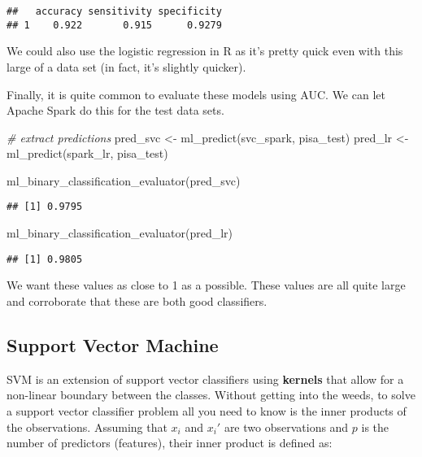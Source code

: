 \documentclass[
]{book}
\newenvironment{Shaded}{\begin{snugshade}}{\end{snugshade}}
\newcommand{\CommentTok}[1]{\textcolor[rgb]{0.56,0.35,0.01}{\textit{#1}}}
\newcommand{\FunctionTok}[1]{\textcolor[rgb]{0.00,0.00,0.00}{#1}}
\newcommand{\NormalTok}[1]{#1}
\newcommand{\OtherTok}[1]{\textcolor[rgb]{0.56,0.35,0.01}{#1}}
\begin{document}
\begin{verbatim}
##   accuracy sensitivity specificity
## 1    0.922       0.915      0.9279
\end{verbatim}

We could also use the logistic regression in R as it's pretty quick even with this large of a data set (in fact, it's slightly quicker).

Finally, it is quite common to evaluate these models using AUC. We can let Apache Spark do this for the test data sets.

\begin{Shaded}
\begin{Highlighting}[]
\CommentTok{\# extract predictions}
\NormalTok{pred\_svc }\OtherTok{\textless{}{-}} \FunctionTok{ml\_predict}\NormalTok{(svc\_spark, pisa\_test)}
\NormalTok{pred\_lr }\OtherTok{\textless{}{-}} \FunctionTok{ml\_predict}\NormalTok{(spark\_lr, pisa\_test)}

\FunctionTok{ml\_binary\_classification\_evaluator}\NormalTok{(pred\_svc)}
\end{Highlighting}
\end{Shaded}

\begin{verbatim}
## [1] 0.9795
\end{verbatim}

\begin{Shaded}
\begin{Highlighting}[]
\FunctionTok{ml\_binary\_classification\_evaluator}\NormalTok{(pred\_lr)}
\end{Highlighting}
\end{Shaded}

\begin{verbatim}
## [1] 0.9805
\end{verbatim}

We want these values as close to 1 as a possible. These values are all quite large and corroborate that these are both good classifiers.

\hypertarget{support-vector-machine}{%
\subsection{Support Vector Machine}\label{support-vector-machine}}

SVM is an extension of support vector classifiers using \textbf{kernels} that allow for a non-linear boundary between the classes. Without getting into the weeds, to solve a support vector classifier problem all you need to know is the inner products of the observations. Assuming that \(x_i\) and \(x_i'\) are two observations and \(p\) is the number of predictors (features), their inner product is defined as:
\end{document}

